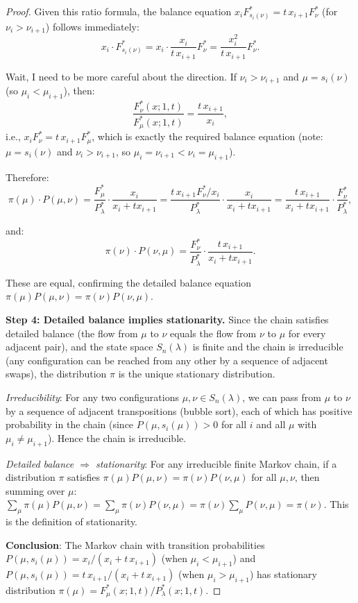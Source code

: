 \documentclass[12pt]{article}
\theoremstyle{definition}
\begin{document}
\begin{proof}
Given this ratio formula, the balance equation $x_i F^*_{s_i(\nu)} = t\,x_{i+1} F^*_\nu$ (for $\nu_i > \nu_{i+1}$) follows immediately:
$$x_i \cdot F^*_{s_i(\nu)} = x_i \cdot \frac{x_i}{t\,x_{i+1}} F^*_\nu = \frac{x_i^2}{t\,x_{i+1}} F^*_\nu.$$

Wait, I need to be more careful about the direction. If $\nu_i > \nu_{i+1}$ and $\mu = s_i(\nu)$ (so $\mu_i < \mu_{i+1}$), then:
$$\frac{F^*_\nu(x;1,t)}{F^*_\mu(x;1,t)} = \frac{t\,x_{i+1}}{x_i},$$
i.e., $x_i F^*_\nu = t\,x_{i+1} F^*_\mu$, which is exactly the required balance equation (note: $\mu = s_i(\nu)$ and $\nu_i > \nu_{i+1}$, so $\mu_i = \nu_{i+1} < \nu_i = \mu_{i+1}$).

Therefore:
$$\pi(\mu) \cdot P(\mu,\nu) = \frac{F^*_\mu}{P^*_\lambda} \cdot \frac{x_i}{x_i+t x_{i+1}} = \frac{t\,x_{i+1} F^*_\nu / x_i}{P^*_\lambda} \cdot \frac{x_i}{x_i+t x_{i+1}} = \frac{t\,x_{i+1}}{x_i+t x_{i+1}} \cdot \frac{F^*_\nu}{P^*_\lambda},$$

and:
$$\pi(\nu) \cdot P(\nu,\mu) = \frac{F^*_\nu}{P^*_\lambda} \cdot \frac{t\,x_{i+1}}{x_i+t x_{i+1}}.$$

These are equal, confirming the detailed balance equation $\pi(\mu)P(\mu,\nu) = \pi(\nu)P(\nu,\mu)$.

\textbf{Step 4: Detailed balance implies stationarity.} Since the chain satisfies detailed balance (the flow from $\mu$ to $\nu$ equals the flow from $\nu$ to $\mu$ for every adjacent pair), and the state space $S_n(\lambda)$ is finite and the chain is irreducible (any configuration can be reached from any other by a sequence of adjacent swaps), the distribution $\pi$ is the unique stationary distribution.

\textit{Irreducibility}: For any two configurations $\mu, \nu \in S_n(\lambda)$, we can pass from $\mu$ to $\nu$ by a sequence of adjacent transpositions (bubble sort), each of which has positive probability in the chain (since $P(\mu,s_i(\mu)) > 0$ for all $i$ and all $\mu$ with $\mu_i \neq \mu_{i+1}$). Hence the chain is irreducible.

\textit{Detailed balance $\Rightarrow$ stationarity}: For any irreducible finite Markov chain, if a distribution $\pi$ satisfies $\pi(\mu)P(\mu,\nu) = \pi(\nu)P(\nu,\mu)$ for all $\mu,\nu$, then summing over $\mu$: $\sum_\mu \pi(\mu) P(\mu,\nu) = \sum_\mu \pi(\nu) P(\nu,\mu) = \pi(\nu)\sum_\mu P(\nu,\mu) = \pi(\nu)$. This is the definition of stationarity.

\textbf{Conclusion}: The Markov chain with transition probabilities $P(\mu,s_i(\mu)) = x_i/(x_i + t\,x_{i+1})$ (when $\mu_i < \mu_{i+1}$) and $P(\mu,s_i(\mu)) = t\,x_{i+1}/(x_i+t\,x_{i+1})$ (when $\mu_i > \mu_{i+1}$) has stationary distribution $\pi(\mu) = F^*_\mu(x;1,t)/P^*_\lambda(x;1,t)$.
\end{proof}
\end{document}
